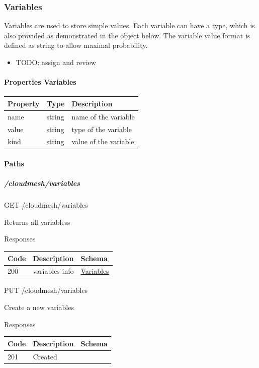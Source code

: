 \documentclass[9pt,]{article}
\providecommand{\tightlist}{%
  \setlength{\itemsep}{0pt}\setlength{\parskip}{0pt}}
\let\oldparagraph\paragraph
\renewcommand{\paragraph}[1]{\oldparagraph{#1}\mbox{}}
\let\oldsubparagraph\subparagraph
\renewcommand{\subparagraph}[1]{\oldsubparagraph{#1}\mbox{}}
\begin{document}
\hypertarget{variables}{%
\subsubsection{Variables}\label{variables}}

Variables are used to store simple values. Each variable can have a
type, which is also provided as demonstrated in the object below. The
variable value format is defined as string to allow maximal probability.

\begin{itemize}
\tightlist
\item
  TODO: assign and review
\end{itemize}

\hypertarget{properties-variables}{%
\paragraph{Properties Variables}\label{properties-variables}}

\begin{longtable}[]{@{}lll@{}}
\toprule
Property & Type & Description\tabularnewline
\midrule
\endhead
name & string & name of the variable\tabularnewline
value & string & type of the variable\tabularnewline
kind & string & value of the variable\tabularnewline
\bottomrule
\end{longtable}

\hypertarget{paths-5}{%
\paragraph{Paths}\label{paths-5}}

\hypertarget{cloudmeshvariables}{%
\subparagraph{/cloudmesh/variables}\label{cloudmeshvariables}}

GET /cloudmesh/variables

Returns all variabless

Responses

\begin{longtable}[]{@{}lll@{}}
\toprule
Code & Description & Schema\tabularnewline
\midrule
\endhead
200 & variables info &
\protect\hyperlink{variables}{Variables}\tabularnewline
\bottomrule
\end{longtable}

PUT /cloudmesh/variables

Create a new variables

Responses

\begin{longtable}[]{@{}lll@{}}
\toprule
Code & Description & Schema\tabularnewline
\midrule
\endhead
201 & Created &\tabularnewline
\bottomrule
\end{longtable}
\end{document}
